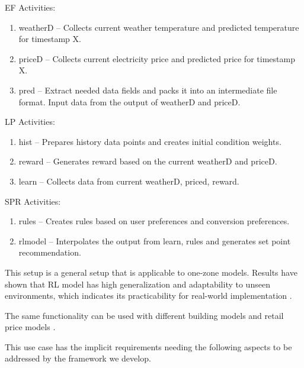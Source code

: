 EF Activities:

\begin{enumerate}
\item weatherD -- Collects current weather temperature and predicted temperature for timestamp X.
\item priceD -- Collects current electricity price and predicted price for timestamp X.
\item pred -- Extract needed data fields and packs it into an intermediate file format. Input data from the output of weatherD and priceD.
\end{enumerate}


LP Activities:

\begin{enumerate}
\item hist -- Prepares history data points and creates initial condition weights.
\item reward -- Generates reward based on the current weatherD and priceD.
\item learn -- Collects data from current weatherD, priced, reward.
\end{enumerate}

SPR Activities:

\begin{enumerate}
\item rules -- Creates rules based on user preferences and conversion preferences.
\item rlmodel --  Interpolates the output from learn, rules and generates set point recommendation.
\end{enumerate}

This setup is a general setup that is applicable to one-zone models. Results have shown that RL model has high generalization and adaptability to unseen environments, which indicates its practicability for real-world implementation \cite{du2021intelligent}.

The same functionality can be used with different building models and retail price models \cite{du2021intelligent}. 



This use case has the implicit requirements needing the following
aspects to be addressed by the framework we develop.

